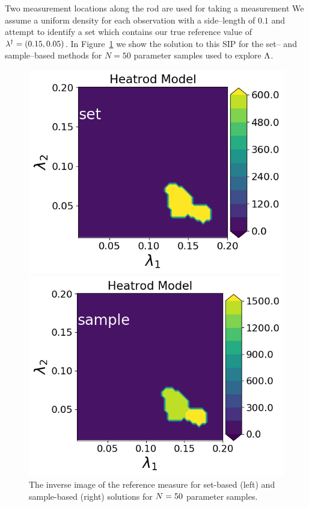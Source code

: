 Two measurement locations along the rod are used for taking a measurement
We assume a uniform density for each observation with a side--length of $0.1$ and attempt to identify a set which contains our true reference value of $\lambda^\dagger = (0.15, 0.05)$.
In Figure~\ref{fig:heatrod-sol-ex} we show the solution to this SIP for the set-- and sample--based methods for $N=50$ parameter samples used to explore ${\Lambda}$.

\begin{figure}[h]
\begin{minipage}{.475\textwidth}
\includegraphics[width=\linewidth]{examples/fig_heatrod_q1/HeatrodModel--set_N50_em.png}
\end{minipage}
\begin{minipage}{.475\textwidth}
\includegraphics[width=\linewidth]{examples/fig_heatrod_q1/HeatrodModel--sample_N50_mc.png}
\end{minipage}
\caption{The inverse image of the reference measure for set-based (left) and sample-based (right) solutions for $N=50$ parameter samples.}
\label{fig:heatrod-sol-ex}
\end{figure}

